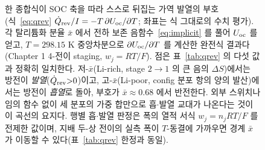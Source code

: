 \begin{figure}[t]
\caption{한 종합식이 SOC 축을 따라 스스로 뒤집는 가역 발열의 부호(식~\eqref{eq:qrev}
$\dot Q_{\mathrm{rev}}/I=-T\,\partial U_{\mathrm{oc}}/\partial T$; 좌표는 식 그대로의 수치 평가). 각 탈리튬화 분율 $\bar x$ 에서 전하
보존 음함수~\eqref{eq:implicit} 를 풀어 $U_{\mathrm{oc}}$ 를 얻고, $T{=}298.15$ K 중앙차분으로 $\partial U_{\mathrm{oc}}/\partial T$ 를
계산한 완전식 결과다(Chapter 1 4-전이 staging, $w_j{=}RT/F$). 점은 표~\ref{tab:qrev} 의 다섯 값과 정확히 일치한다.
저-$\bar x$(Li-rich, stage $2\!\to\!1$ 의 큰 음의 $\Delta S$)에서는 방전이 \emph{발열}($\dot Q_{\mathrm{rev}}{>}0$)이고,
고-$\bar x$(Li-poor, config 분포 항의 양의 발산)에서는 방전이 \emph{흡열}로 돌아, 부호가 $\bar x{\approx}0.68$
에서 반전한다. 외부 스위치나 임의 함수 없이 세 분포의 가중 합만으로 흡$\cdot$발열 교대가 나온다는 것이 이 곡선의
요지다. 행별 흡$\cdot$발열 판정은 폭의 열적 서식 $w_j{=}n_jRT/F$ 를 전제한 값이며, 지배 두-상 전이의 실측 폭이
$T$-동결에 가까우면 경계 $\bar x$ 가 이동할 수 있다(표~\ref{tab:qrev} 한정과 동일).}
\label{fig:cand-fo3-2}
\end{figure}
